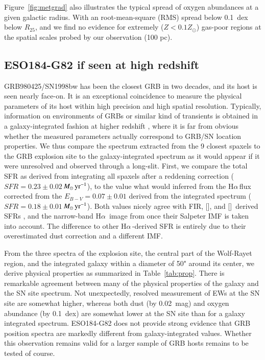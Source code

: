 \documentclass[traditabstract]{aa}
\newcommand{\ha}{H$\alpha$}
\newcommand{\oi}{[\ion{O}{i}]}
\newcommand{\cii}{[\ion{C}{ii}]}
\newcommand{\Msunyr}{$M_\odot\,\rm{yr}^{-1}$}
\begin{document}
Figure~\ref{fig:metgrad} also illustrates the typical spread of oxygen abundances at a given galactic radius. With an root-mean-square (RMS) spread below 0.1~dex below $R_{25}$, and we find no evidence for extremely ($Z < 0.1 Z_\odot$) gas-poor regions at the spatial scales probed by our observation (100 pc). 

\subsection{ESO184-G82 if seen at high redshift}


GRB980425/SN1998bw has been the closest GRB in two decades, and its host is seen nearly face-on. It is an exceptional coincidence to measure the physical parameters of its host within high precision and high spatial resolution. Typically, information on environments of GRBs or similar kind of transients is obtained in a galaxy-integrated fashion at higher redshift \citep{2015A&A...581A.125K, 2016A&A...590A.129J}, where it is far from obvious whether the measured parameters actually correspond to GRB/SN location properties. We thus compare the spectrum extracted from the 9 closest spaxels to the GRB explosion site to the galaxy-integrated spectrum as it would appear if it were unresolved and observed through a long-slit. First, we compare the total SFR as derived from integrating all spaxels after a reddening correction ($SFR=0.23\pm0.02$\,\Msunyr), to the value what would inferred from the \ha\,flux corrected from the $E_{B-V}=0.07\pm0.01$ derived from the integrated spectrum ($SFR=0.18\pm0.01$\,\Msunyr). Both values nicely agree with FIR, \oi, and \cii\, derived SFRs \citep{2014A&A...562A..70M, 2016arXiv160901742M}, and the narrow-band \ha\, image from \citet{2005NewA...11..103S} once their Salpeter IMF is taken into account. The difference to other \ha\,-derived SFR \citep{2006A&A...454..103H, 2008A&A...490...45C} is entirely due to their overestimated dust correction and a different IMF.

From the three spectra of the explosion site, the central part of the Wolf-Rayet region, and the integrated galaxy within a diameter of 50" around its center, we derive physical properties as summarized in Table~\ref{tab:prop}. There is remarkable agreement between many of the physical properties of the galaxy and the SN site spectrum. Not unexpectedly, resolved measurement of EWs at the SN site are somewhat higher, whereas both dust (by 0.02~mag) and oxygen abundance (by 0.1~dex) are somewhat lower at the SN site than for a galaxy integrated spectrum. ESO184-G82 does not provide strong evidence that GRB position spectra are markedly different from galaxy-integrated values. Whether this observation remains valid for a larger sample of GRB hosts remains to be tested of course.
\end{document}
